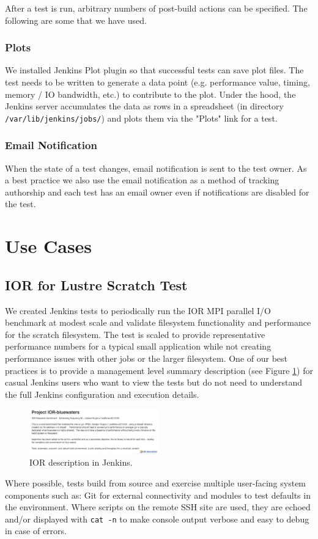 \documentclass[10pt, conference, compsocconf]{IEEEtran}
\begin{document}
After a test is run, arbitrary numbers of post-build actions can be specified. 
The following are some that we have used. 

\subsubsection{Plots}
We installed Jenkins Plot plugin \cite{JenkinsPlotPlugin} so that successful tests can save plot files. 
The test needs to be written to generate a data point (e.g. performance value, timing, memory / IO bandwidth, etc.) to contribute to the plot. 
Under the hood, the Jenkins server accumulates the data as rows in a spreadsheet (in directory \texttt{/var/lib/jenkins/jobs/}) and plots them via the "Plots" link for a test.

\subsubsection{Email Notification}
When the state of a test changes, email notification is sent to the test owner. 
As a best practice we also use the email notification as a method of tracking authorship and each test has an email owner even if notifications are disabled for the test.

\section{Use Cases}
\label{sec:UseCases}
\subsection{IOR for Lustre Scratch Test}
We created Jenkins tests to periodically run the IOR MPI parallel I/O benchmark at modest scale and validate filesystem functionality and performance for the scratch filesystem. 
The test is scaled to provide representative performance numbers for a typical small application while not creating performance issues with other jobs or the larger filesystem.
One of our best practices is to provide a management level summary description (see Figure \ref{fig:IOR-bluewaters-descr}) for casual Jenkins users who want to view the tests but do not need to understand the full Jenkins configuration and execution details. 
 
\begin{figure}[H]
\centering
\includegraphics[width=0.5\textwidth]{IOR-bluewaters-descr}
\caption{IOR description in Jenkins.}
\label{fig:IOR-bluewaters-descr}
\end{figure}
Where possible, tests build from source and exercise multiple user-facing system components such as: Git for external connectivity and modules to test defaults in the environment. 
Where scripts on the remote SSH site are used, they are echoed and/or displayed with \texttt{cat -n} to make console output verbose and easy to debug in case of errors. 
 
\end{document}
